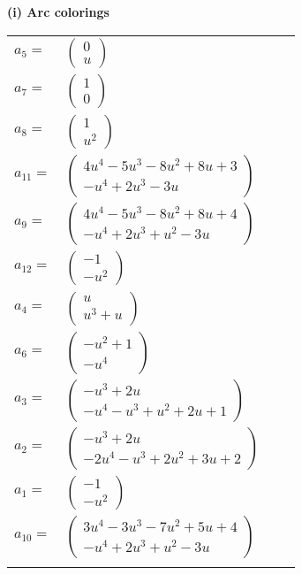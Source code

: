 \documentclass[1p]{elsarticle_modified}
\theoremstyle{definition}
\begin{document}
\flushleft \textbf{(i) Arc colorings}\\
\begin{tabular}{m{7pt} m{180pt} m{7pt} m{180pt} }
\flushright $a_{5}=$&$\begin{pmatrix}0\\u\end{pmatrix}$ \\
\flushright $a_{7}=$&$\begin{pmatrix}1\\0\end{pmatrix}$ \\
\flushright $a_{8}=$&$\begin{pmatrix}1\\u^2\end{pmatrix}$ \\
\flushright $a_{11}=$&$\begin{pmatrix}4 u^4-5 u^3-8 u^2+8 u+3\\- u^4+2 u^3-3 u\end{pmatrix}$ \\
\flushright $a_{9}=$&$\begin{pmatrix}4 u^4-5 u^3-8 u^2+8 u+4\\- u^4+2 u^3+u^2-3 u\end{pmatrix}$ \\
\flushright $a_{12}=$&$\begin{pmatrix}-1\\- u^2\end{pmatrix}$ \\
\flushright $a_{4}=$&$\begin{pmatrix}u\\u^3+u\end{pmatrix}$ \\
\flushright $a_{6}=$&$\begin{pmatrix}- u^2+1\\- u^4\end{pmatrix}$ \\
\flushright $a_{3}=$&$\begin{pmatrix}- u^3+2 u\\- u^4- u^3+u^2+2 u+1\end{pmatrix}$ \\
\flushright $a_{2}=$&$\begin{pmatrix}- u^3+2 u\\-2 u^4- u^3+2 u^2+3 u+2\end{pmatrix}$ \\
\flushright $a_{1}=$&$\begin{pmatrix}-1\\- u^2\end{pmatrix}$ \\
\flushright $a_{10}=$&$\begin{pmatrix}3 u^4-3 u^3-7 u^2+5 u+4\\- u^4+2 u^3+u^2-3 u\end{pmatrix}$\\&\end{tabular}
\end{document}
